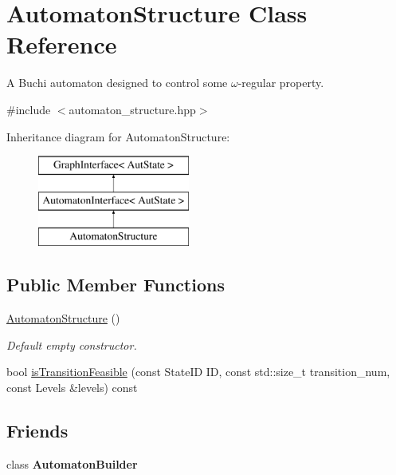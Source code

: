 \hypertarget{classAutomatonStructure}{\section{\-Automaton\-Structure \-Class \-Reference}
\label{classAutomatonStructure}
}


\-A \-Buchi automaton designed to control some $\omega$-\/regular property.  




{\ttfamily \#include $<$automaton\-\_\-structure.\-hpp$>$}

\-Inheritance diagram for \-Automaton\-Structure\-:\begin{figure}[H]
\begin{center}
\leavevmode
\includegraphics[height=3.000000cm]{classAutomatonStructure}
\end{center}
\end{figure}
\subsection*{\-Public \-Member \-Functions}
\begin{DoxyCompactItemize}
\item 
\hypertarget{classAutomatonStructure_a71e2f5d77f0118e9fc0dbaeb5024b9a1}{\hyperlink{classAutomatonStructure_a71e2f5d77f0118e9fc0dbaeb5024b9a1}{\-Automaton\-Structure} ()}\label{classAutomatonStructure_a71e2f5d77f0118e9fc0dbaeb5024b9a1}

\begin{DoxyCompactList}\small\item\em \-Default empty constructor. \end{DoxyCompactList}\item 
bool \hyperlink{classAutomatonStructure_a3075f9c11cb21b6bab25854bac866eea}{is\-Transition\-Feasible} (const \-State\-I\-D \-I\-D, const std\-::size\-\_\-t transition\-\_\-num, const \-Levels \&levels) const 
\end{DoxyCompactItemize}
\subsection*{\-Friends}
\begin{DoxyCompactItemize}
\item 
\hypertarget{classAutomatonStructure_aa8c70fdebc72ce387f4c6dbf6291f149}{class {\bfseries \-Automaton\-Builder}}\label{classAutomatonStructure_aa8c70fdebc72ce387f4c6dbf6291f149}

\end{DoxyCompactItemize}



